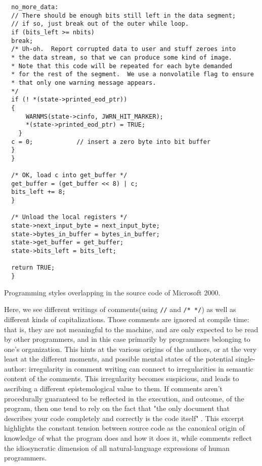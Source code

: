 \begin{listing}
  \begin{verbatim}
  no_more_data:
  // There should be enough bits still left in the data segment;
  // if so, just break out of the outer while loop.
  if (bits_left >= nbits)
  break;
  /* Uh-oh.  Report corrupted data to user and stuff zeroes into
  * the data stream, so that we can produce some kind of image.
  * Note that this code will be repeated for each byte demanded
  * for the rest of the segment.  We use a nonvolatile flag to ensure
  * that only one warning message appears.
  */
  if (! *(state->printed_eod_ptr))
  {
      WARNMS(state->cinfo, JWRN_HIT_MARKER);
      *(state->printed_eod_ptr) = TRUE;
    }
  c = 0;			// insert a zero byte into bit buffer
  }
  }

  /* OK, load c into get_buffer */
  get_buffer = (get_buffer << 8) | c;
  bits_left += 8;
  }

  /* Unload the local registers */
  state->next_input_byte = next_input_byte;
  state->bytes_in_buffer = bytes_in_buffer;
  state->get_buffer = get_buffer;
  state->bits_left = bits_left;

  return TRUE;
  }
  \end{verbatim}
  \caption{Programming styles overlapping in the source code of Microsoft 2000.}
  \label{code:buffer_c}
\end{listing}

Here, we see different writings of comments(using \lstinline{//} and \lstinline{/* */}) as well as  different kinds of capitalizations. Those comments are ignored at compile time: that is, they are not meaningful to the machine, and are only expected to be read by other programmers, and in this case primarily by programmers belonging to one's organization. This hints at the various origins of the authors, or at the very least at the different moments, and possible mental states of the potential single-author: irregularity in comment writing can connect to irregularities in semantic content of the comments. This irregularity becomes suspicious, and leads to ascribing a different epistemological value to them. If comments aren't procedurally guaranteed to be reflected in the execution, and outcome, of the program, then one tend to rely on the fact that "the only document that describes your code completely and correctly is the code itself" \citep{goodliffe_code_2007}. This excerpt highlights the constant tension between source code as the canonical origin of knowledge of what the program does and how it does it, while comments reflect the idiosyncratic dimension of all natural-language expressions of human programmers.

